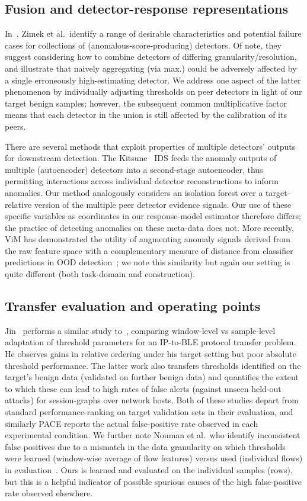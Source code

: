 \subsection{Fusion and detector-response representations} 
In~\cite{zimek2014}, Zimek et al.\ identify a range of desirable characteristics and potential failure cases for collections of (anomalous-score-producing) detectors. Of note, they suggest considering how to combine detectors of differing granularity/resolution, and illustrate that naively aggregating (via max.) could be adversely affected by a single erroneously high-estimating detector. We address one aspect of the latter phenomenon by individually adjusting thresholds on peer detectors in light of our target benign samples; however, the subsequent common multiplicative factor means that each detector in the union is still affected by the calibration of its peers.

There are several methods that exploit properties of multiple detectors' outputs for downstream detection. The Kitsune~\cite{kitsune2018} IDS feeds the anomaly outputs of multiple (autoencoder) detectors into a second-stage autoencoder, thus permitting interactions across individual detector reconstructions to inform anomalies. Our method analogously considers an isolation forest over a target-relative version of the multiple peer detector evidence signals. Our use of these specific variables as coordinates in our response-model estimator therefore differs; the practice of detecting anomalies on these meta-data does not. More recently, ViM has demonstrated the utility of augmenting anomaly signals derived from the raw feature space with a complementary measure of distance from classifier predictions in OOD detection~\cite{vim2022}; we note this similarity but again our setting is quite different (both task-domain and construction).

\subsection{Transfer evaluation and operating points} 
Jin~\cite{jin2026crossprotocol} performs a similar study to~\cite{ha2026targetfpr}, comparing window-level vs sample-level adaptation of threshold parameters for an IP-to-BLE protocol transfer problem. He observes gains in relative ordering under his target setting but poor absolute threshold performance. The latter work also transfers thresholds identified on the target's benign data (validated on further benign data) and quantifies the extent to which these can lead to high rates of false alerts (against unseen held-out attacks) for session-graphs over network hosts. Both of these studies depart from standard performance-ranking on target validation sets in their evaluation, and similarly PACE reports the actual false-positive rate observed in each experimental condition. We further note Nouman et al.\ who identify inconsistent false positives due to a mismatch in the data granularity on which thresholds were learned (window-wise average of flow features) versus used (individual flows) in evaluation~\cite{nouman2026granularity}. Ours is learned and evaluated on the individual samples (rows), but this is a helpful indicator of possible spurious causes of the high false-positive rate observed elsewhere.
